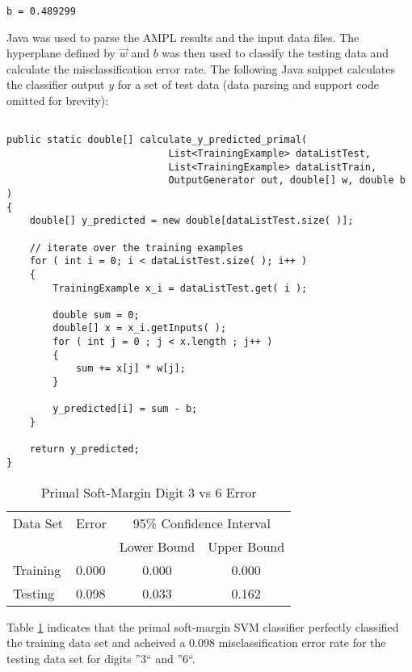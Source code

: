 \documentclass{article}
\begin{document}
\begin{verbatim}
b = 0.489299

\end{verbatim}

Java was used to parse the AMPL results and the input data files. The hyperplane defined by \(\vec{w}\) and \(b\) was then used to classify the testing data and calculate the misclassification error rate. The following Java snippet calculates the classifier output \(y\) for a set of test data (data parsing and support code omitted for brevity):

\begin{verbatim}

public static double[] calculate_y_predicted_primal(
                            List<TrainingExample> dataListTest,
                            List<TrainingExample> dataListTrain,
                            OutputGenerator out, double[] w, double b )
{
    double[] y_predicted = new double[dataListTest.size( )];

    // iterate over the training examples
    for ( int i = 0; i < dataListTest.size( ); i++ )
    {
        TrainingExample x_i = dataListTest.get( i );

        double sum = 0;
        double[] x = x_i.getInputs( );
        for ( int j = 0 ; j < x.length ; j++ )
        {
            sum += x[j] * w[j];
        }

        y_predicted[i] = sum - b;
    }

    return y_predicted;
}

\end{verbatim}

\begin{table}\label{table1}
\caption{Primal Soft-Margin Digit 3 vs 6 Error}
\begin{center}
\begin{tabular}{llcc}
\toprule
Data Set & Error & \multicolumn{2}{c}{95\% Confidence Interval} \\
\cmidrule(r){3-4}
& & Lower Bound & Upper Bound \\
\midrule
Training & 0.000 & 0.000 & 0.000 \\
Testing & 0.098 & 0.033 & 0.162 \\
\bottomrule
\end{tabular}
\end{center}
\end{table}

Table \ref{table1} indicates that the primal soft-margin SVM classifier perfectly classified the training data set and acheived a \(0.098\) misclassification error rate for the testing data set for digits ''3`` and ''6``.
\end{document}
